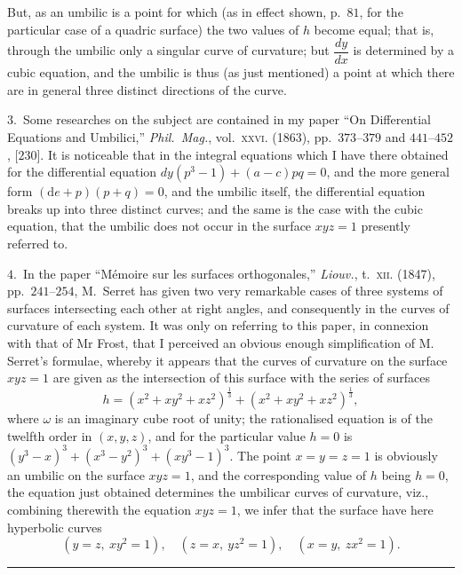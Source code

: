 \documentclass[11pt,a4paper]{article}
\providecommand{\dd}{\mathrm{d}}
\begin{document}
\medskip

But, as an umbilic is a point for which (as in effect shown, p.~$81$, for
the particular case of a quadric surface) the two values of $h$ become equal;
that is, through the umbilic only a singular curve of curvature; but
$\dfrac{dy}{dx}$ is determined by a cubic equation, and the umbilic is thus
(as just mentioned) a point at which there are in general three distinct
directions of the curve.

\medskip

\noindent$3$.\ Some researches on the subject are contained in my paper
``On Differential Equations and Umbilici,'' \textit{Phil.\ Mag.}, vol.\
\textsc{xxvi.} (1863), pp.~$373$--$379$ and $441$--$452$, [$230$]. It is
noticeable that in the integral equations which I have there obtained for
the differential equation $dy(p^{3} - 1) + (a - c)pq = 0$, and the more
general form $(\dd e + p)(p + q) = 0$, and the umbilic itself, the
differential equation breaks up into three distinct curves; and the same
is the case with the cubic equation, that the umbilic does not occur in
the surface $xyz = 1$ presently referred to.

\medskip

\noindent$4$.\ In the paper ``M\'emoire sur les surfaces orthogonales,''
\textit{Liouv.}, t.~\textsc{xii.} (1847), pp.~$241$--$254$, M.~Serret
has given two very remarkable cases of three systems of surfaces
intersecting each other at right angles, and consequently in the curves
of curvature of each system. It was only on referring to this paper, in
connexion with that of Mr Frost, that I perceived an obvious enough
simplification of M. Serret's formulae, whereby it appears that the curves
of curvature on the surface $xyz = 1$ are given as the intersection of
this surface with the series of surfaces
\[
h = (x^{2} + xy^{2} + xz^{2})^{\tfrac{1}{3}} + (x^{2} + xy^{2} + xz^{2})^{\tfrac{1}{3}},
\]
where $\omega$ is an imaginary cube root of unity; the rationalised
equation is of the twelfth order in $(x, y, z)$, and for the particular
value $h = 0$ is $(y^{3} - x)^{3} + (x^{3} - y^{2})^{3} + (xy^{3} - 1)^{3}$.
The point $x = y = z = 1$ is obviously an umbilic on the surface $xyz = 1$,
and the corresponding value of $h$ being $h = 0$, the equation just
obtained determines the umbilicar curves of curvature, viz., combining
therewith the equation $xyz = 1$, we infer that the surface have here
hyperbolic curves
\[
(y = z,\ x y^{2} = 1),\quad (z = x,\ y z^{2} = 1),\quad (x = y,\ z x^{2} = 1).
\]

\bigskip
\hrule
\bigskip
\end{document}
